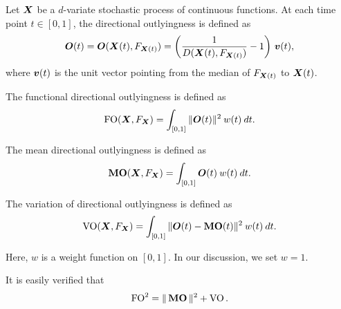 \begin{definition}
    Let $\bm{X}$ be a $d$-variate stochastic process of continuous functions.
    At each time point $t \in [0, 1]$, the directional outlyingness is defined
    as
    \begin{equation}
        \bm{O}(t) = \bm{O}(\bm{X}(t), F_{\bm{X}(t)}) = \left(\frac{1}{D(\bm{X}(t), F_{\bm{X}(t)})} - 1\right)\, \bm{v}(t),
    \end{equation}
    where $\bm{v}(t)$ is the unit vector pointing from the median of $F_{\bm{X}(t)}$
    to $\bm{X}(t)$.
\end{definition}

\begin{definition}
    The functional directional outlyingness is defined as
    \begin{equation}
        \operatorname{FO}(\bm{X}, F_{\bm{X}}) = \int_{[0, 1]} \Vert \bm{O}(t) \Vert^2 \:w(t)\:dt.
    \end{equation}
\end{definition}

\begin{definition}
    \label{def:MO}
    The mean directional outlyingness is defined as
    \begin{equation}
        \operatorname{\textbf{MO}}(\bm{X}, F_{\bm{X}}) = \int_{[0, 1]} \bm{O}(t) \:w(t)\:dt.
    \end{equation}
\end{definition}

\begin{definition}
    The variation of directional outlyingness is defined as
    \begin{equation}
        \operatorname{VO}(\bm{X}, F_{\bm{X}}) = \int_{[0, 1]} \Vert \bm{O}(t) - \operatorname{\textbf{MO}}(t) \Vert^2 \:w(t)\:dt.
    \end{equation}
\end{definition}

Here, $w$ is a weight function on $[0, 1]$.
In our discussion, we set $w = 1$.

It is easily verified that
\begin{equation}
    \operatorname{FO}^2 = \Vert \operatorname{\textbf{MO}} \Vert^2 + \operatorname{VO}.
\end{equation}

